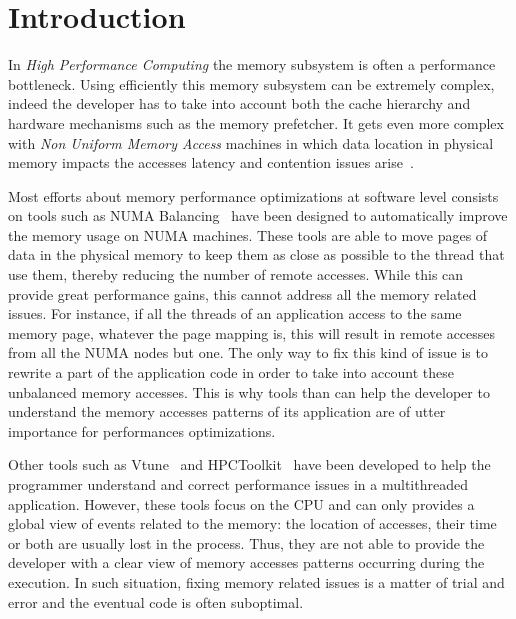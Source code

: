 \section{Introduction}
\label{sec:intro}

In \emph{High Performance Computing} the memory subsystem is often a performance bottleneck.
Using efficiently this memory subsystem can be extremely
complex, indeed the developer has to take into account both the cache hierarchy and
hardware mechanisms such as the memory prefetcher. It gets even more complex with
\emph{Non Uniform Memory Access} machines in which data location in
physical memory impacts the accesses latency and contention issues arise~\cite{Drepper07What}.

Most efforts about memory performance optimizations at software level consists
on tools such as NUMA Balancing~\cite{Corbet2012} have been designed to automatically improve the
memory usage on NUMA machines. These tools are able to move pages of data in the
physical memory to keep them as close as possible to the thread that use them, thereby
reducing the number of remote accesses. While this can provide great performance gains,
this cannot address all the memory related issues. For instance, if all the
threads of an application access to the same memory page, whatever the page mapping is,
this will result in remote accesses from all the NUMA nodes but one. The only way to fix
this kind of issue is to rewrite a part of the application code in order to take into account these
unbalanced memory accesses. This is why tools than can help the developer to understand the memory accesses patterns
of its application are of utter importance for performances optimizations.

Other tools such as Vtune~\cite{Reinders05VTune} and
HPCToolkit~\cite{Adhianto10HPCTOOLKIT} have been developed to help the programmer
understand and correct performance issues in a multithreaded application. However, these tools
focus on the CPU and can only provides a global view of events related to the memory: the location of accesses,
their time or both are usually lost in the process. Thus, they are not able to provide the developer with
a clear view of memory accesses patterns occurring during the execution. In such situation, fixing
memory related issues is a matter of trial and error and the eventual code is often suboptimal.

